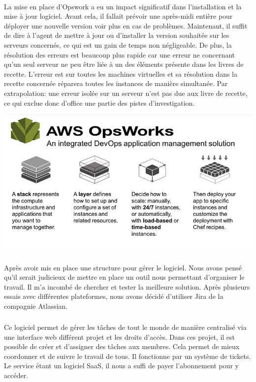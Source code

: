 \documentclass[11pt, a4paper ]{article}
\begin{document}
\begin{spacing}{1.5}
\paragraph{}
La mise en place d'Opswork a eu un impact significatif dans l'installation et la mise à jour logiciel. Avant cela, il fallait prévoir une après-midi entière pour déployer une nouvelle version voir plus en cas de problèmes. Maintenant, il suffit de dire à l'agent de mettre à jour ou d'installer la version souhaitée sur les serveurs concernés, ce qui est un gain de temps non négligeable. De plus, la résolution des erreurs est beaucoup plus rapide car une erreur ne concernant qu'un seul serveur ne peu être liée à un des éléments présente dans les livres de recette. L'erreur est sur toutes les machines virtuelles et sa résolution dans la recette concernée réparera toutes les instances de manière simultanée. Par extrapolation: une erreur isolée sur un serveur n'est pas due aux livre de recette, ce qui exclue donc d'office une partie des pistes d'investigation.
\begin{center}
	\includegraphics[width=\textwidth]{images/opswork.png}
\end{center}

\paragraph{}
Après avoir mis en place une structure pour gérer le logiciel. Nous avons pensé qu'il serait judicieux de mettre en place un outil nous permettant d'organiser le travail. Il m'a incombé de chercher et tester la meilleure solution. Après plusieurs essais avec différentes plateformes, nous avons décidé d'utiliser Jira de la compagnie Atlassian.
\subparagraph{}
Ce logiciel permet de gérer les tâches de tout le monde de manière centralisé via une interface web différent projet et les droits d’accès. Dans ces projet, il est possible de créer et d'assigner des tâches aux membres. Cela permet de mieux coordonner et de suivre le travail de tous. Il fonctionne par un système de tickets. Le service étant un logiciel SaaS, il nous a suffi de payer l'abonnement pour y accéder.



\end{spacing}
\end{document}
